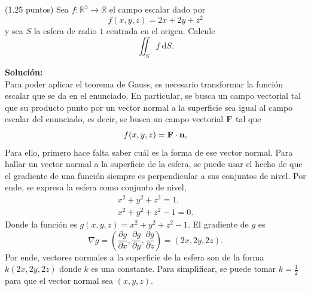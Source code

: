 \documentclass{fmbvecto}
\begin{document}
\begin{problema}
    
    (1.25 puntos) Sea \(f\colon \mathbb{R}^3 \to \mathbb{R}\) el campo escalar dado por
    \[
    f(x, y, z) = 2x + 2y + z^2
    \]
    y sea \(S\) la esfera de radio \(1\) centrada en el origen. Calcule
    \[
    \iint_S f \: \mathrm{d}S.
    \]

\tcblower
\textbf{Solución:}\\

    

    Para poder aplicar el teorema de Gauss, es necesario transformar la función escalar que se da en el enunciado. En particular, se busca un campo vectorial tal que su producto punto por un vector normal a la superficie sea igual al campo escalar del enunciado, es decir, se busca un campo vectorial \(\boldsymbol{{\mathbf{F}}}\) tal que
    \[
    f(x, y, z) = \boldsymbol{{\mathbf{F}}} \cdot \boldsymbol{{\mathbf{n}}},
    \]
    Para ello, primero hace falta saber cuál es la forma de ese vector normal. Para hallar un vector normal a la superficie de la esfera, se puede usar el hecho de que el gradiente de una función siempre es perpendicular a sus conjuntos de nivel. Por ende, se expresa la esfera como conjunto de nivel,
    \begin{gather*}
        x^2 + y^2 + z^2 = 1, \\
        x^2 + y^2 + z^2 - 1 = 0.
    \end{gather*} 
    Donde la función es \(g(x, y, z) = x^2 + y^2 + z^2 - 1\). El gradiente de \(g\) es
    \[
    \nabla g = \left( \frac{\partial g}{\partial x}, \frac{\partial g}{\partial y}, \frac{\partial g}{\partial z} \right) = (2x, 2y, 2z).
    \]
    Por ende, vectores normales a la superficie de la esfera son de la forma \(k(2x, 2y, 2z)\) donde \(k\) es una constante. Para simplificar, se puede tomar \(k = \frac{1}{2}\) para que el vector normal sea \((x, y, z)\).\\
   

\end{problema}
\end{document}
